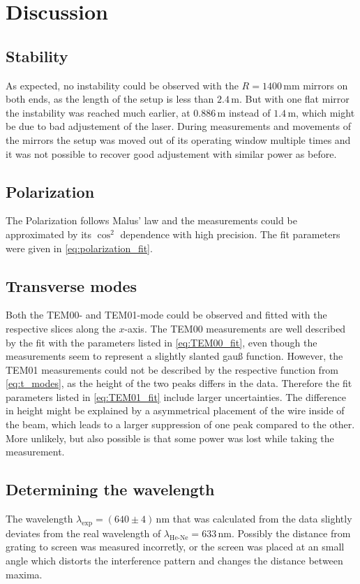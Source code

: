 \section{Discussion}
\label{sec:discussion}
\subsection{Stability}
As expected, no instability could be observed with the $R=1400\,\unit{\mm}$ mirrors on both ends, as the length of the setup is less than $2.4\,\unit{\m}$. 
But with one flat mirror the instability was reached much earlier, at $0.886\,\unit{\m}$ instead of $1.4\,\unit{\m}$, which might be due to bad adjustement of the laser. 
During measurements and movements of the mirrors the setup was moved out of its operating window multiple times and 
it was not possible to recover good adjustement with similar power as before. 

\subsection{Polarization}
The Polarization follows Malus' law and the measurements could be approximated by its $\cos^2$ dependence with high precision. 
The fit parameters were given in \eqref{eq:polarization_fit}. 

\subsection{Transverse modes}
Both the TEM00- and TEM01-mode could be observed and fitted with the respective slices along the $x$-axis. 
The TEM00 measurements are well described by the fit with the parameters listed in \eqref{eq:TEM00_fit}, 
even though the measurements seem to represent a slightly slanted gauß function. 
However, the TEM01 measurements could not be described by the respective function from \eqref{eq:t_modes}, %
as the height of the two peaks differs in the data. 
Therefore the fit parameters listed in \eqref{eq:TEM01_fit} include larger uncertainties. 
The difference in height might be explained by a asymmetrical placement of the wire inside of the beam, which leads to a larger suppression of one peak compared to the other. 
More unlikely, but also possible is that some power was lost while taking the measurement. 

\subsection{Determining the wavelength}
The wavelength $\lambda_{\text{exp}}=(640\pm4)\,\unit{\nm}$ that was calculated from the data 
slightly deviates from the real wavelength of $\lambda_{\text{He-Ne}}=633\,\unit{\nm}$. 
Possibly the distance from grating to screen was measured incorretly, 
or the screen was placed at an small angle which distorts the interference pattern and changes the distance between maxima. 